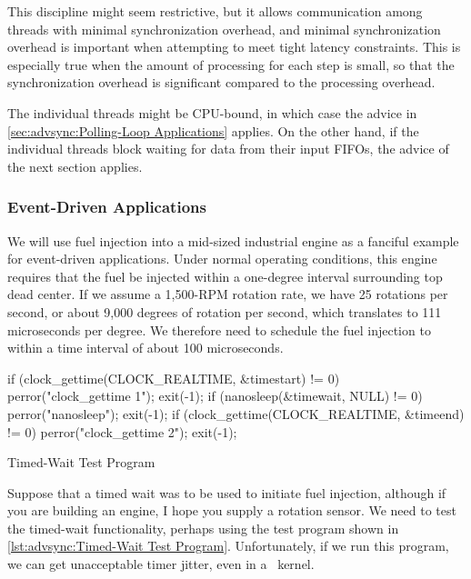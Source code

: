 This discipline might seem restrictive, but it allows communication
among threads with minimal synchronization overhead, and minimal
synchronization overhead is important when attempting to meet
tight latency constraints.
This is especially true when the amount of processing for each step
is small, so that the synchronization overhead is significant compared
to the processing overhead.

The individual threads might be CPU-bound, in which case the advice in
\cref{sec:advsync:Polling-Loop Applications} applies.
On the other hand, if the individual threads block waiting for
data from their input FIFOs, the advice of the next section applies.

\subsubsection{Event-Driven Applications}
\label{sec:advsync:Event-Driven Applications}

We will use fuel injection into a mid-sized industrial engine as a
fanciful example for event-driven applications.
Under normal operating conditions, this engine requires that the fuel
be injected within a one-degree interval surrounding top dead center.
If we assume a 1,500-RPM rotation rate, we have 25 rotations per second,
or about 9,000 degrees of rotation per second, which translates to
111 microseconds per degree.
We therefore need to schedule the fuel injection to within a time
interval of about 100 microseconds.

\begin{listing}[tb]
\begin{fcvlabel}
\begin{VerbatimL}
if (clock_gettime(CLOCK_REALTIME, &timestart) != 0) {
	perror("clock_gettime 1");
	exit(-1);
}
if (nanosleep(&timewait, NULL) != 0) {
	perror("nanosleep");
	exit(-1);
}
if (clock_gettime(CLOCK_REALTIME, &timeend) != 0) {
	perror("clock_gettime 2");
	exit(-1);
}
\end{VerbatimL}
\end{fcvlabel}
\caption{Timed-Wait Test Program}
\label{lst:advsync:Timed-Wait Test Program}
\end{listing}

Suppose that a timed wait was to be used to initiate fuel injection,
although if you are building an engine, I hope you supply a rotation
sensor.
We need to test the timed-wait functionality, perhaps using the test program
shown in
\cref{lst:advsync:Timed-Wait Test Program}.
Unfortunately, if we run this program, we can get unacceptable timer
jitter, even in a \rt\ kernel.

